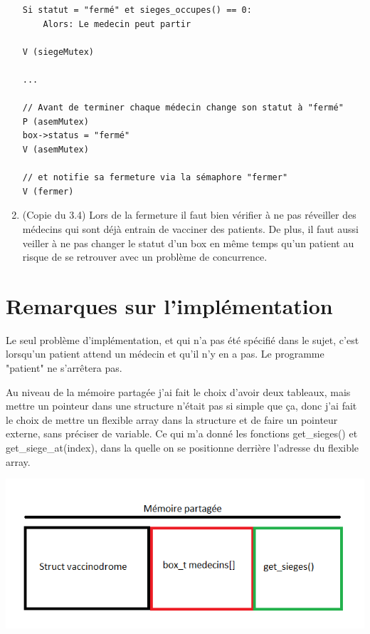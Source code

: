 \documentclass[a4paper]{article}
\begin{document}
\begin{enumerate}
\begin{verbatim}
Si statut = "fermé" et sieges_occupes() == 0:
    Alors: Le medecin peut partir

V (siegeMutex)

...

// Avant de terminer chaque médecin change son statut à "fermé"
P (asemMutex)
box->status = "fermé"
V (asemMutex)

// et notifie sa fermeture via la sémaphore "fermer"
V (fermer)
\end{verbatim}

  \item (Copie du 3.4) Lors de la fermeture il faut bien vérifier à ne pas réveiller des médecins qui sont déjà entrain de vacciner des patients. De plus, il faut aussi veiller à ne pas changer le statut d'un box en même temps qu'un patient au risque de se retrouver avec un problème de concurrence.
  \end{enumerate}
\newpage

\section{Remarques sur l'implémentation}
 Le seul problème d'implémentation, et qui n'a pas été spécifié dans le sujet, c'est lorsqu'un patient attend un médecin et qu'il n'y en a pas. Le programme "patient" ne s'arrêtera pas. \par

  Au niveau de la mémoire partagée j'ai fait le choix d'avoir deux tableaux, mais mettre un pointeur dans une structure n'était pas si simple que ça, donc j'ai fait le choix de mettre un flexible array dans la structure et de faire un pointeur externe, sans préciser de variable. Ce qui m'a donné les fonctions get\_sieges() et get\_siege\_at(index), dans la quelle on se positionne derrière l'adresse du flexible array.

\includegraphics[scale=0.8]{mempartagee.png}
\label{fig1}
\end{document}

